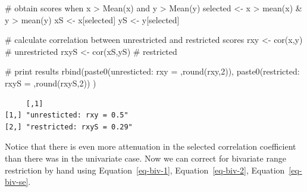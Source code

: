 \documentclass[
  letterpaper,
  DIV=11,
  numbers=noendperiod]{scrreprt}
\newenvironment{Shaded}{\begin{snugshade}}{\end{snugshade}}
\newcommand{\CommentTok}[1]{\textcolor[rgb]{0.37,0.37,0.37}{#1}}
\newcommand{\DecValTok}[1]{\textcolor[rgb]{0.68,0.00,0.00}{#1}}
\newcommand{\FunctionTok}[1]{\textcolor[rgb]{0.28,0.35,0.67}{#1}}
\newcommand{\NormalTok}[1]{\textcolor[rgb]{0.00,0.23,0.31}{#1}}
\newcommand{\OtherTok}[1]{\textcolor[rgb]{0.00,0.23,0.31}{#1}}
\newcommand{\SpecialCharTok}[1]{\textcolor[rgb]{0.37,0.37,0.37}{#1}}
\newcommand{\StringTok}[1]{\textcolor[rgb]{0.13,0.47,0.30}{#1}}
\begin{document}
\begin{Shaded}
\begin{Highlighting}[]
\CommentTok{\# obtain scores when x \textgreater{} Mean(x) and y \textgreater{} Mean(y)}
\NormalTok{selected }\OtherTok{\textless{}{-}}\NormalTok{ x }\SpecialCharTok{\textgreater{}} \FunctionTok{mean}\NormalTok{(x) }\SpecialCharTok{\&}\NormalTok{ y }\SpecialCharTok{\textgreater{}} \FunctionTok{mean}\NormalTok{(y)}
\NormalTok{xS }\OtherTok{\textless{}{-}}\NormalTok{ x[selected]}
\NormalTok{yS }\OtherTok{\textless{}{-}}\NormalTok{ y[selected]}

\CommentTok{\# calculate correlation between unrestricted and restricted scores}
\NormalTok{rxy }\OtherTok{\textless{}{-}} \FunctionTok{cor}\NormalTok{(x,y) }\CommentTok{\# unrestricted}
\NormalTok{rxyS }\OtherTok{\textless{}{-}} \FunctionTok{cor}\NormalTok{(xS,yS) }\CommentTok{\# restricted}

\CommentTok{\# print results}
\FunctionTok{rbind}\NormalTok{(}\FunctionTok{paste0}\NormalTok{(}\StringTok{\textquotesingle{}unresticted: rxy = \textquotesingle{}}\NormalTok{,}\FunctionTok{round}\NormalTok{(rxy,}\DecValTok{2}\NormalTok{)),}
      \FunctionTok{paste0}\NormalTok{(}\StringTok{\textquotesingle{}restricted: rxyS = \textquotesingle{}}\NormalTok{,}\FunctionTok{round}\NormalTok{(rxyS,}\DecValTok{2}\NormalTok{))}
\NormalTok{      )}
\end{Highlighting}
\end{Shaded}

\begin{verbatim}
     [,1]                     
[1,] "unresticted: rxy = 0.5" 
[2,] "restricted: rxyS = 0.29"
\end{verbatim}

Notice that there is even more attenuation in the selected correlation
coefficient than there was in the univariate case. Now we can correct
for bivariate range restriction by hand using Equation~\ref{eq-biv-1},
Equation~\ref{eq-biv-2}, Equation~\ref{eq-biv-se}.
\end{document}
